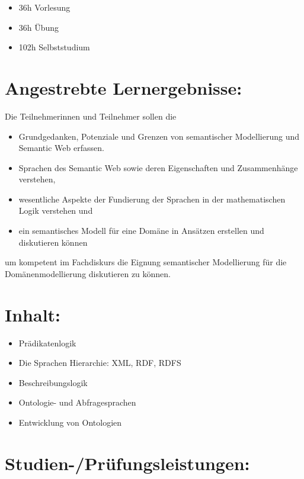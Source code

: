\begin{itemize}
\tightlist
\item
  36h Vorlesung
\item
  36h Übung
\item
  102h Selbststudium
\end{itemize}

\section*{Angestrebte
Lernergebnisse:}\label{angestrebte-lernergebnisse-20}

Die Teilnehmerinnen und Teilnehmer sollen die

\begin{itemize}
\tightlist
\item
  Grundgedanken, Potenziale und Grenzen von semantischer Modellierung
  und Semantic Web erfassen.
\item
  Sprachen des Semantic Web sowie deren Eigenschaften und Zusammenhänge
  verstehen,
\item
  wesentliche Aspekte der Fundierung der Sprachen in der mathematischen
  Logik verstehen und
\item
  ein semantisches Modell für eine Domäne in Ansätzen erstellen und
  diskutieren können
\end{itemize}

um kompetent im Fachdiskurs die Eignung semantischer Modellierung für
die Domänenmodellierung diskutieren zu können.

\section*{Inhalt:}\label{inhalt-20}

\begin{itemize}
\tightlist
\item
  Prädikatenlogik
\item
  Die Sprachen Hierarchie: XML, RDF, RDFS
\item
  Beschreibungslogik
\item
  Ontologie- und Abfragesprachen
\item
  Entwicklung von Ontologien
\end{itemize}

\section*{Studien-/Prüfungsleistungen:}\label{studien-pruxfcfungsleistungen-20}

